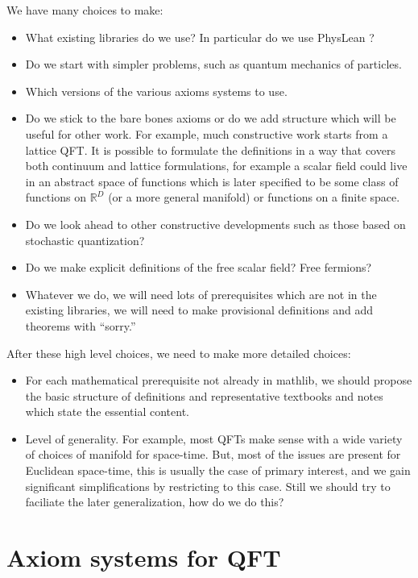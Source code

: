 \documentclass{article}
\def\IR{\mathbb{R}}
\begin{document}
We have many choices to make:
\begin{itemize}
    \item What existing libraries do we use?  In particular do we use PhysLean ?
    \item Do we start with simpler problems, such as quantum mechanics of particles.
    \item Which versions of the various axioms systems to use.
    \item Do we stick to the bare bones axioms or do we add structure which will be useful for other work.
    For example, much constructive work starts from a lattice QFT.  It is possible to formulate the definitions
    in a way that covers both continuum and lattice formulations, for example a scalar field could live in an
    abstract space of functions which is later specified to be some class of functions on $\IR^D$ (or a more
    general manifold) or functions on a finite space.
    \item Do we look ahead to other constructive developments such as those based on stochastic quantization?
    \item Do we make explicit definitions of the free scalar field?  Free fermions?
    \item Whatever we do, we will need lots of prerequisites which are not in the existing libraries, we will need to make
    provisional definitions and add theorems with ``sorry.''
\end{itemize}

After these high level choices, we need to make more detailed choices:
\begin{itemize}
    \item For each mathematical prerequisite not already in mathlib, we should propose the basic structure of
    definitions and representative textbooks and notes which state the essential content.
    \item Level of generality.  For example, most QFTs make sense with a wide variety of choices of manifold for space-time.
    But, most of the issues are present for Euclidean space-time, this is usually the case of primary interest,
    and we gain significant simplifications by restricting to this case.
    Still we should try to faciliate the later generalization, how do we do this?
\end{itemize}

\section{Axiom systems for QFT}
\end{document}
